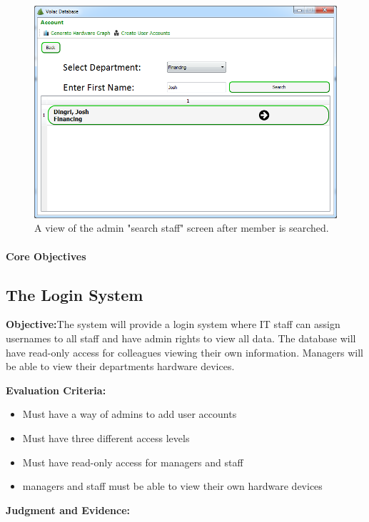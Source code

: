 \begin{figure}[H]
    \includegraphics[width=\textwidth]{./Evaluation/Images/afteradv.png}
    \caption{A view of the admin "search staff" screen after member is searched.} 
\end{figure}

\paragraph{Core Objectives}

\subsection{The Login System}

\textbf{Objective:}The system will provide a login system where IT staff can assign usernames to all staff and have admin rights to view all data. The database will have read-only access for colleagues viewing their own information. Managers will be able to view their departments hardware devices.

\textbf{Evaluation Criteria:}
\begin{itemize}
\item{Must have a way of admins to add user accounts}
\item{Must have three different access levels}
\item{Must have read-only access for managers and staff}
\item{managers and staff must be able to view their own hardware devices}
\end{itemize}

\textbf{Judgment and Evidence:}

